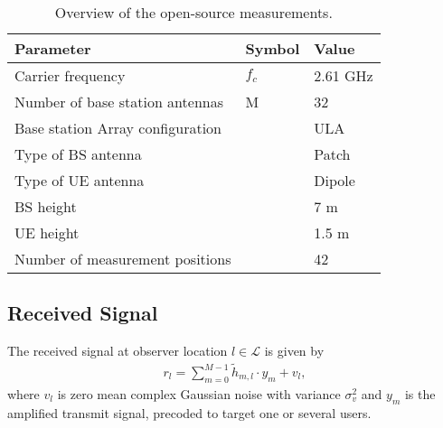 \documentclass[conference]{IEEEtran}
\newcommand{\ra}[1]{\renewcommand{\arraystretch}{#1}}
\newcommand{\liesbet}[1]{{\color{olive}[Liesbet: #1]}}
\begin{document}



\begin{table}[]
    \centering
    \ra{1.3}
    \caption{Overview of the open-source measurements.}
    \label{tab:measurements}
    \begin{tabular}{@{}lll@{}}
    \toprule
         Parameter & Symbol & Value  \\
    \midrule
         Carrier frequency & $f_c$ & 2.61 GHz\\
         Number of base station antennas & M & 32\\
         Base station Array configuration & & ULA\\
         Type of BS antenna & & Patch\\
         Type of UE antenna & & Dipole\\
         BS height & & 7 m\\
         UE height & & 1.5 m\\
         Number of measurement positions & & 42\\
    \bottomrule
    \end{tabular}
\end{table}


\subsection{Received Signal}
The received signal at observer location $l\in \mathcal{L}$ is given by
\begin{align*}
r_l = \sum_{m=0}^{M-1} \tilde{h}_{m,l} \cdot y_m + v_l ,
\end{align*}
where $v_l$ is zero mean complex Gaussian noise with variance $\sigma_v^2$ and $y_m$ is the amplified transmit signal, precoded to target one or several users.
\end{document}
